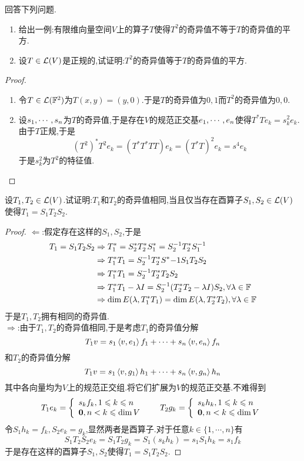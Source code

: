 \documentclass{ctexart}
\begin{document}
\begin{problem}[12.]
    回答下列问题.
    \begin{enumerate}[label=\tbf{(\arabic*)}]
        \item 给出一例:有限维向量空间$V$上的算子$T$使得$T^2$的奇异值不等于$T$的奇异值的平方.
        \item 设$T\in\mathcal{L}(V)$是正规的,试证明:$T^2$的奇异值等于$T$的奇异值的平方.
    \end{enumerate}
\end{problem}
\begin{proof}
    \begin{enumerate}[label=\tbf{(\arabic*)}]
        \item 令$T\in\mathcal{L}(\mathbb{F}^2)$为$T(x,y)=(y,0)$.于是$T$的奇异值为$0,1$而$T^2$的奇异值为$0,0$.
        \item 设${s}_1,\cdots,{s}_{n}$为$T$的奇异值,于是存在$V$的规范正交基${e}_1,\cdots,{e}_{n}$使得$T^*Te_k=s_k^2e_k$.由于$T$正规,于是
            \[(T^2)^*T^2e_k=(T^*T^*TT)e_k=(T^*T)^2e_k=s^4e_k\]
            于是$s_k^2$为$T^2$的特征值.
    \end{enumerate}
\end{proof}
\begin{problem}[13.]
    设$T_1,T_2\in\mathcal{L}(V)$.试证明:$T_1$和$T_2$的奇异值相同,当且仅当存在酉算子$S_1,S_2\in\mathcal{L}(V)$使得$T_1=S_1T_2S_2$.
\end{problem}
\begin{proof}
    $\Leftarrow$:假定存在这样的$S_1,S_2$,于是
    \[\begin{aligned}
        T_1=S_1T_2S_2
        &\Rightarrow T_1^*=S_2^*T_2^*S_1^*=S_2^{-1}T_2^*S_1^{-1} \\
        &\Rightarrow T_1^*T_1=S_2^{-1}T_2^*S^*{-1}S_1T_2S_2 \\
        &\Rightarrow T_1^*T_1=S_2^{-1}T_2^*T_2S_2 \\
        &\Rightarrow T_1^*T_1-\lambda I=S_2^{-1}(T_2^*T_2-\lambda I)S_2,\forall\lambda\in\mathbb{F} \\
        &\Rightarrow \dim E(\lambda,T_1^*T_1)=\dim E(\lambda,T_2^*T_2),\forall\lambda\in\mathbb{F}
    \end{aligned}\]
    于是$T_1,T_2$拥有相同的奇异值.\\
    $\Rightarrow$:由于$T_1,T_2$的奇异值相同,于是考虑$T_1$的奇异值分解
    \[T_1v=s_1\left\langle{v},{e_1}\right\rangle f_1+\cdots+s_n\left\langle{v},{e_n}\right\rangle f_n\]
    和$T_2$的奇异值分解
    \[T_1v=s_1\left\langle{v},{g_1}\right\rangle h_1+\cdots+s_n\left\langle{v},{g_n}\right\rangle h_n\]
    其中各向量均为$V$上的规范正交组.将它们扩展为$V$的规范正交基.不难得到
    \[T_1e_k=\left\{\begin{array}{l}
        s_kf_k,1\leqslant k\leqslant n\\
        \mbf0,n<k\leqslant\dim V
    \end{array}\right.\ \ \ \ \ 
    T_2g_k=\left\{\begin{array}{l}
        s_kh_k,1\leqslant k\leqslant n\\
        \mbf0,n<k\leqslant\dim V
    \end{array}\right.\]
    令$S_1h_k=f_k,S_2e_k=g_k$,显然两者是酉算子.对于任意$k\in\{1,\cdots,n\}$有
    \[S_1T_2S_2e_k=S_1T_2g_k=S_1(s_kh_k)=s_1S_1h_k=s_1f_k\]
    于是存在这样的酉算子$S_1,S_2$使得$T_1=S_1T_2S_2$.
\end{proof}
\end{document}

